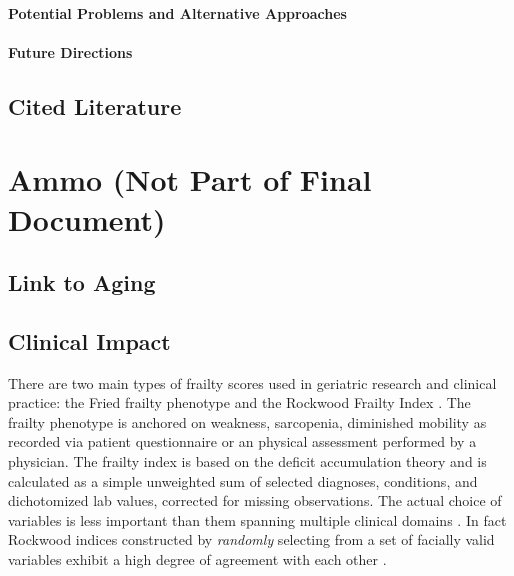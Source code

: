 \paragraph{Potential Problems and Alternative
      Approaches}\label{potential-problems-and-alternative-approaches}

\paragraph{Future Directions}\label{future-directions} 
    
\subsection{Cited Literature}\label{cited-literature}


\section{Ammo (Not Part of Final Document)}\label{ammo}

\subsection{Link to Aging}\label{link-to-aging}

\subsection{Clinical Impact}\label{clinical-impact}
There are two main types of frailty scores used in geriatric research and clinical practice: the Fried frailty phenotype \cite{Fried_2001} and the Rockwood Frailty Index \cite{Mitnitski_2001}. The frailty phenotype is anchored on weakness, sarcopenia, diminished mobility as recorded via patient questionnaire or an physical assessment performed by a physician. The frailty index is based on the deficit accumulation theory and is calculated as a simple unweighted sum of selected diagnoses, conditions, and dichotomized lab values, corrected for missing observations. The actual choice of variables is less important than them spanning multiple clinical domains \cite{Searle_2008}. In fact Rockwood indices constructed by \textit{randomly} selecting from a set of facially valid variables exhibit a high degree of agreement with each other \cite{Mitnitski_2001}.

